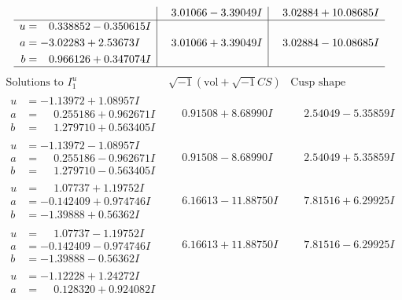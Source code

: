 \documentclass[1p]{elsarticle_modified}
\theoremstyle{definition}
\newcommand{\I}{\sqrt{-1}}
\begin{document}
$$\begin{array}{c|c|c}
 & \phantom{-}3.01066 - 3.39049 I & \phantom{-}3.02884 + 10.08685 I \\ \hline\begin{aligned}
u &= \phantom{-}0.338852 - 0.350615 I \\
a &= -3.02283 + 2.53673 I \\
b &= \phantom{-}0.966126 + 0.347074 I\end{aligned}
 & \phantom{-}3.01066 + 3.39049 I & \phantom{-}3.02884 - 10.08685 I\\
 \hline 
 \end{array}$$\newpage$$\begin{array}{c|c|c}  
\text{Solutions to }I^u_{1}& \I (\text{vol} + \sqrt{-1}CS) & \text{Cusp shape}\\
 \hline 
\begin{aligned}
u &= -1.13972 + 1.08957 I \\
a &= \phantom{-}0.255186 + 0.962671 I \\
b &= \phantom{-}1.279710 + 0.563405 I\end{aligned}
 & \phantom{-}0.91508 + 8.68990 I & \phantom{-}2.54049 - 5.35859 I \\ \hline\begin{aligned}
u &= -1.13972 - 1.08957 I \\
a &= \phantom{-}0.255186 - 0.962671 I \\
b &= \phantom{-}1.279710 - 0.563405 I\end{aligned}
 & \phantom{-}0.91508 - 8.68990 I & \phantom{-}2.54049 + 5.35859 I \\ \hline\begin{aligned}
u &= \phantom{-}1.07737 + 1.19752 I \\
a &= -0.142409 + 0.974746 I \\
b &= -1.39888 + 0.56362 I\end{aligned}
 & \phantom{-}6.16613 - 11.88750 I & \phantom{-}7.81516 + 6.29925 I \\ \hline\begin{aligned}
u &= \phantom{-}1.07737 - 1.19752 I \\
a &= -0.142409 - 0.974746 I \\
b &= -1.39888 - 0.56362 I\end{aligned}
 & \phantom{-}6.16613 + 11.88750 I & \phantom{-}7.81516 - 6.29925 I \\ \hline\begin{aligned}
u &= -1.12228 + 1.24272 I \\
a &= \phantom{-}0.128320 + 0.924082 I \\

\end{aligned}
\end{array}$$
\end{document}
